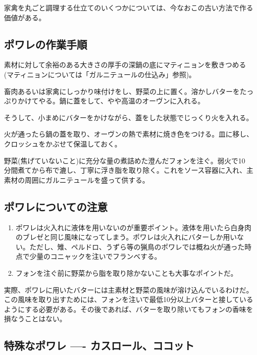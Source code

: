 家禽を丸ごと調理する仕立てのいくつかについては、今なおこの古い方法で作る価値がある。

\hypertarget{ux30ddux30efux30ecux306eux4f5cux696dux624bux9806}{%
\subsection{ポワレの作業手順}\label{ux30ddux30efux30ecux306eux4f5cux696dux624bux9806}}

素材に対して余裕のある大きさの厚手の深鍋の底にマティニョンを敷きつめる
(マティニョンについては「ガルニテュールの仕込み」参照)。

畜肉あるいは家禽にしっかり味付けをし、野菜の上に置く。溶かしバターをたっぷりかけてやる。鍋に蓋をして、やや高温のオーヴンに入れる。

そうして、小まめにバターをかけながら、蓋をした状態でじっくり火を入れる。

火が通ったら鍋の蓋を取り、オーヴンの熱で素材に焼き色をつける。皿に移し、クロッシュをかぶせて保温しておく。

野菜(焦げていないこと)に充分な量の煮詰めた澄んだフォンを注ぐ。弱火で10
分間煮てから布で漉し、丁寧に浮き脂を取り除く。これをソース容器に入れ、主素材の周囲にガルニテュールを盛って供する。

\hypertarget{ux30ddux30efux30ecux306bux3064ux3044ux3066ux306eux6ce8ux610f}{%
\subsection{ポワレについての注意}\label{ux30ddux30efux30ecux306bux3064ux3044ux3066ux306eux6ce8ux610f}}

\begin{enumerate}
\def\labelenumi{\arabic{enumi}.}
\item
  ポワレは火入れに液体を用いないのが重要ポイント。液体を用いたら白身肉のブレゼと同じ風味になってしまう。ポワレは火入れにバターしか用いない。ただし、雉、ペルドロ、うずら等の猟鳥のポワレでは概ね火が通った時点で少量のコニャックを注いでフランベする。
\item
  フォンを注ぐ前に野菜から脂を取り除かないことも大事なポイントだ。
\end{enumerate}

実際、ポワレに用いたバターには主素材と野菜の風味が溶け込んでいるわけだ。この風味を取り出すためには、フォンを注いで最低10分以上バターと接しているようにする必要がある。その後であれば、バターを取り除いてもフォンの香味を損なうことはない。

\hypertarget{ux7279ux6b8aux306aux30ddux30efux30ec-ux30abux30b9ux30edux30fcux30ebux30b3ux30b3ux30c3ux30c8}{%
\subsection{特殊なポワレ ----
カスロール、ココット}\label{ux7279ux6b8aux306aux30ddux30efux30ec-ux30abux30b9ux30edux30fcux30ebux30b3ux30b3ux30c3ux30c8}}

